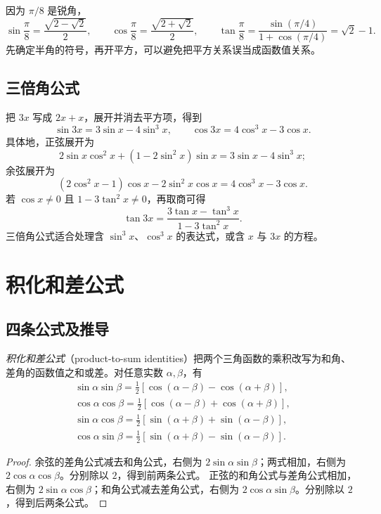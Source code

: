 \documentclass[UTF8,12pt,a4paper,fontset=fandol]{ctexart}
\begin{document}
\begin{example}[用半角求值]
因为 $\pi/8$ 是锐角，
\[
  \sin\frac\pi8=\frac{\sqrt{2-\sqrt2}}2,\qquad
  \cos\frac\pi8=\frac{\sqrt{2+\sqrt2}}2,\qquad
  \tan\frac\pi8=\frac{\sin(\pi/4)}{1+\cos(\pi/4)}=\sqrt2-1.
\]
先确定半角的符号，再开平方，可以避免把平方关系误当成函数值关系。
\end{example}

\subsection{三倍角公式}

把 $3x$ 写成 $2x+x$，展开并消去平方项，得到
\begin{equation}\label{eq:trig-triple}
  \boxed{\sin3x=3\sin x-4\sin^3x,\qquad
  \cos3x=4\cos^3x-3\cos x}.
\end{equation}
具体地，正弦展开为
\[
  2\sin x\cos^2x+(1-2\sin^2x)\sin x
  =3\sin x-4\sin^3x;
\]
余弦展开为
\[
  (2\cos^2x-1)\cos x-2\sin^2x\cos x
  =4\cos^3x-3\cos x.
\]
若 $\cos x\ne0$ 且 $1-3\tan^2x\ne0$，再取商可得
\[
  \tan3x=\frac{3\tan x-\tan^3x}{1-3\tan^2x}.
\]
三倍角公式适合处理含 $\sin^3x$、$\cos^3x$ 的表达式，或含 $x$ 与 $3x$ 的方程。

\section{积化和差公式}
\label{sec:trig-product-to-sum}

\subsection{四条公式及推导}

\emph{积化和差公式}（product-to-sum identities）把两个三角函数的乘积改写为和角、差角的函数值之和或差。对任意实数 $\alpha,\beta$，有
\begin{align}
  \boxed{\sin\alpha\sin\beta
  =\frac12[\cos(\alpha-\beta)-\cos(\alpha+\beta)]},\label{eq:trig-prod-ss}\\
  \boxed{\cos\alpha\cos\beta
  =\frac12[\cos(\alpha-\beta)+\cos(\alpha+\beta)]},\label{eq:trig-prod-cc}\\
  \boxed{\sin\alpha\cos\beta
  =\frac12[\sin(\alpha+\beta)+\sin(\alpha-\beta)]},\label{eq:trig-prod-sc}\\
  \boxed{\cos\alpha\sin\beta
  =\frac12[\sin(\alpha+\beta)-\sin(\alpha-\beta)]}.\label{eq:trig-prod-cs}
\end{align}

\begin{proof}
余弦的差角公式减去和角公式，右侧为 $2\sin\alpha\sin\beta$；两式相加，右侧为 $2\cos\alpha\cos\beta$。分别除以 $2$，得到前两条公式。
正弦的和角公式与差角公式相加，右侧为 $2\sin\alpha\cos\beta$；和角公式减去差角公式，右侧为 $2\cos\alpha\sin\beta$。分别除以 $2$，得到后两条公式。
\end{proof}
\end{document}
